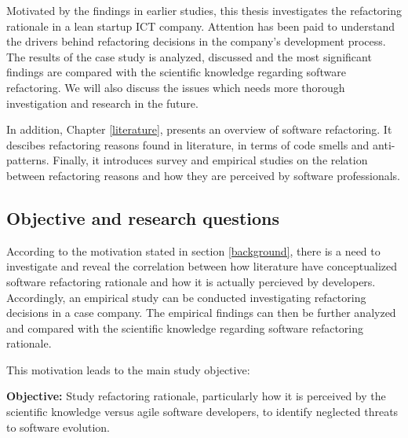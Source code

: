 Motivated by the findings in earlier studies, this thesis investigates the refactoring rationale in a lean startup ICT company. Attention has been paid to understand the drivers behind refactoring decisions in the company's development process. The results of the case study is analyzed, discussed and the most significant findings are compared with the scientific knowledge regarding software refactoring. We will also discuss the issues which needs more thorough investigation and research in the future.

In addition, Chapter \ref{literature}, presents an overview of software refactoring. It descibes refactoring reasons found in literature, in terms of code smells and anti-patterns. Finally, it introduces survey and empirical studies on the relation between refactoring reasons and how they are perceived by software professionals.




\subsection{Objective and research questions} \label{questions}
According to the motivation stated in section \ref{background}, there is a need to investigate and reveal the correlation between how literature have conceptualized software refactoring rationale and how it is actually percieved by developers. Accordingly, an empirical study can be conducted investigating refactoring decisions in a case company. The empirical findings can then be further analyzed and compared with the scientific knowledge regarding software refactoring rationale. 

This motivation leads to the main study objective:

\textbf{Objective:} Study refactoring rationale, particularly how it is perceived by the scientific knowledge versus agile software developers, to identify neglected threats to software evolution.

